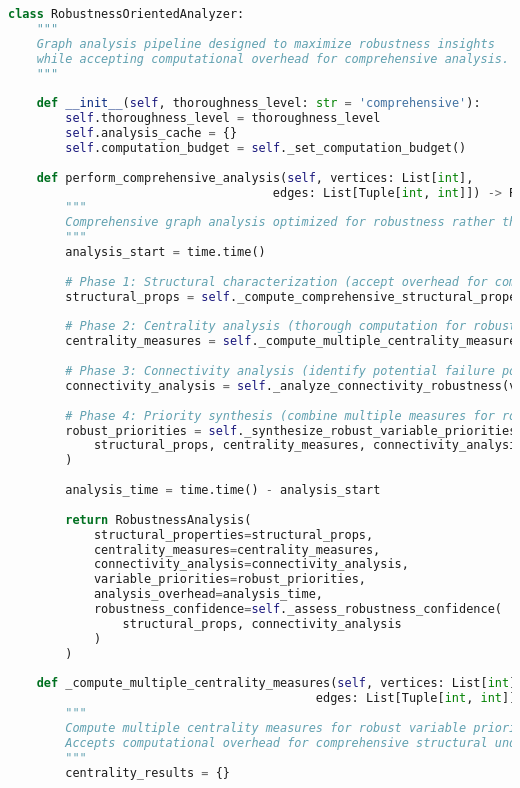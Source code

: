 \begin{lstlisting}[language=Python, caption=Robustness-Oriented Graph Analysis Pipeline]
class RobustnessOrientedAnalyzer:
    """
    Graph analysis pipeline designed to maximize robustness insights
    while accepting computational overhead for comprehensive analysis.
    """
    
    def __init__(self, thoroughness_level: str = 'comprehensive'):
        self.thoroughness_level = thoroughness_level
        self.analysis_cache = {}
        self.computation_budget = self._set_computation_budget()
        
    def perform_comprehensive_analysis(self, vertices: List[int], 
                                     edges: List[Tuple[int, int]]) -> RobustnessAnalysis:
        """
        Comprehensive graph analysis optimized for robustness rather than speed.
        """
        analysis_start = time.time()
        
        # Phase 1: Structural characterization (accept overhead for completeness)
        structural_props = self._compute_comprehensive_structural_properties(vertices, edges)
        
        # Phase 2: Centrality analysis (thorough computation for robust priorities)
        centrality_measures = self._compute_multiple_centrality_measures(vertices, edges)
        
        # Phase 3: Connectivity analysis (identify potential failure points)
        connectivity_analysis = self._analyze_connectivity_robustness(vertices, edges)
        
        # Phase 4: Priority synthesis (combine multiple measures for robustness)
        robust_priorities = self._synthesize_robust_variable_priorities(
            structural_props, centrality_measures, connectivity_analysis
        )
        
        analysis_time = time.time() - analysis_start
        
        return RobustnessAnalysis(
            structural_properties=structural_props,
            centrality_measures=centrality_measures,
            connectivity_analysis=connectivity_analysis,
            variable_priorities=robust_priorities,
            analysis_overhead=analysis_time,
            robustness_confidence=self._assess_robustness_confidence(
                structural_props, connectivity_analysis
            )
        )
    
    def _compute_multiple_centrality_measures(self, vertices: List[int], 
                                           edges: List[Tuple[int, int]]) -> Dict[str, Dict[int, float]]:
        """
        Compute multiple centrality measures for robust variable prioritization.
        Accepts computational overhead for comprehensive structural understanding.
        """
        centrality_results = {}
        

\end{lstlisting}

